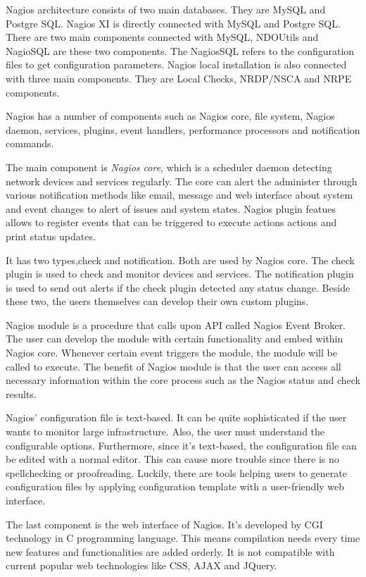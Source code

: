 \documentclass[9pt,twocolumn,twoside]{styles/osajnl}
\begin{document}
Nagios architecture consists of two main databases. They are MySQL and
Postgre SQL.  Nagios XI is directly connected with MySQL and Postgre
SQL. There are two main components connected with MySQL, NDOUtils and
NagioSQL are these two components. The NagiosSQL refers to the
configuration files to get configuration parameters. Nagios local
installation is also connected with three main components. They are
Local Checks, NRDP/NSCA and NRPE components.

Nagios has a number of components such as Nagios core, file system,
Nagios daemon, services, plugins, event handlers, performance processors
and notification commands.

The main component is {\em Nagios core}, which is a scheduler daemon
detecting network devices and services regularly. The core can alert
the administer through various notification methods like email,
message and web interface about system and event changes to alert of
issues and system states. Nagios plugin featues allows to register
events that can be triggered to execute actions actions and print
status updates.

It has two types,check and notification. Both are used by Nagios
core. The check plugin is used to check and monitor devices and
services. The notification plugin is used to send out alerts if the
check plugin detected any status change. Beside these two, the users
themselves can develop their own custom plugins.

Nagios module is a procedure that calls upon API called Nagios Event
Broker. The user can develop the module with certain functionality and
embed within Nagios core. Whenever certain event triggers the module,
the module will be called to execute. The benefit of Nagios module is
that the user can access all necessary information within the core
process such as the Nagios status and check results.

Nagios' configuration file is text-based. It can be quite
sophisticated if the user wants to monitor large infrastructure. Also,
the user must understand the configurable options. Furthermore, since
it's text-based, the configuration file can be edited with a normal
editor. This can cause more trouble since there is no spellchecking or
proofreading. Luckily, there are tools helping users to generate
configuration files by applying configuration template with a
user-friendly web interface.

The last component is the web interface of Nagios. It's developed by
CGI technology in C programming language. This means compilation needs
every time new features and functionalities are added orderly. It is
not compatible with current popular web technologies like CSS, AJAX
and JQuery.
\end{document}
